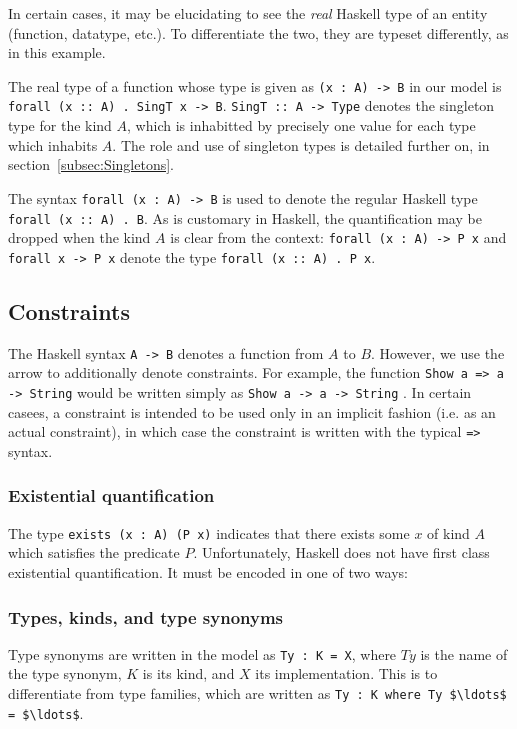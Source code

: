 In certain cases, it may be elucidating to see the \emph{real} Haskell type of
an entity (function, datatype, etc.). To differentiate the two, they are typeset
differently, as in this example.

The real type of a function whose type is given as \lstinline!(x : A) -> B! in
our model is \texttt{forall (x :: A) . SingT x -> B}. \texttt{SingT :: A -> 
Type}
denotes the singleton type for the kind $A$, which is inhabitted by precisely
one value for each type which inhabits $A$. The role and use of singleton types
is detailed further on, in section~\ref{subsec:Singletons}. 

The syntax \lstinline!forall (x : A) -> B! is used to denote the regular
Haskell type \texttt{forall (x :: A) . B}. As is customary in Haskell, the 
quantification
may be dropped when the kind $A$ is clear from the context: 
\lstinline!forall (x : A) -> P x! 
and
\lstinline!forall x -> P x! denote the type \texttt{forall (x :: A) . P x}.

\subsection{Constraints}
The Haskell syntax \texttt{A -> B} denotes a function from $A$ to $B$. However,
we use the arrow to additionally denote constraints. For example, the function
\texttt{Show a => a -> String} would be written simply as \lstinline!Show a -> a -> String!
.
In certain casees, a constraint is intended to be used only in an implicit 
fashion 
(i.e. as an actual constraint), in which case the constraint is written with 
the typical \lstinline{=>} syntax. 

\subsubsection{Existential quantification}
The type \lstinline!exists (x : A) (P x)! indicates that there exists some $x$
of kind $A$ which satisfies the predicate $P$. Unfortunately, Haskell does not
have first class existential quantification. It must be encoded in one of
two ways:

\subsubsection{Types, kinds, and type synonyms}
Type synonyms are written in the model as \lstinline!Ty : K = X!, where $Ty$ is 
the name
of the type synonym, $K$ is its kind, and $X$ its implementation. This is to 
differentiate
from type families, which are written as 
\lstinline!Ty : K where Ty $\ldots$ = $\ldots$!.

